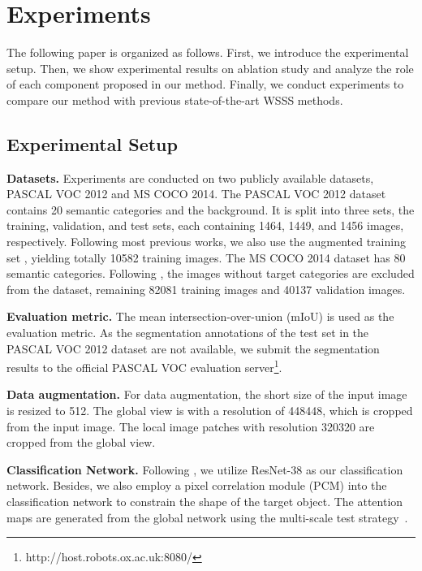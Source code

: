 \documentclass[10pt,twocolumn,letterpaper]{article}
\newcommand{\myParaP}[1]{\vspace{.05in}\noindent\textbf{#1}}
\begin{document}
\section{Experiments} 
The following paper is organized as follows.
First, we introduce the experimental setup.
Then, we show experimental results on ablation study
and analyze the role of each component proposed in our method.
Finally, we conduct experiments to compare our method with 
previous state-of-the-art WSSS methods.





\subsection{Experimental Setup} \label{sec:exp_setup}


\myParaP{Datasets.}
Experiments are conducted on two publicly available datasets, PASCAL VOC 2012
and MS COCO 2014.
The PASCAL VOC 2012 dataset contains 20 semantic categories and the background.
It is split into three sets, the training, validation, and test sets, 
each containing 1464, 1449, and 1456 images, respectively.
Following most previous works, we also use the augmented training set 
\cite{hariharan2011semantic}, yielding totally 10582 training images.
The MS COCO 2014 dataset has 80 semantic categories. 
Following \cite{choe2020attention,lee2021railroad}, the images without 
target categories are excluded from the dataset, remaining 
82081 training images and 40137 validation images. 


\myParaP{Evaluation metric.}
The mean intersection-over-union (mIoU) \cite{long2015fully} 
is used as the evaluation metric.
As the segmentation annotations of the test set in the PASCAL VOC 2012 dataset
are not available, we submit the segmentation results to the official PASCAL VOC 
evaluation server\footnote{http://host.robots.ox.ac.uk:8080/}.



\myParaP{Data augmentation.}
For data augmentation, the short size of the input image 
is resized to 512.
The global view is with a resolution of 448448, which
is cropped from the input image.
The local image patches with resolution 320320 are 
cropped from the global view.




\myParaP{Classification Network.}
Following \cite{ahn2018learning,lee2021railroad}, we utilize 
ResNet-38 \cite{wu2019wider} as our classification network.
Besides, we also employ a pixel correlation module (PCM) \cite{wang2020self} 
into the classification network to constrain the shape of 
the target object.
The attention maps are generated from the global network 
using the multi-scale test strategy~\cite{ahn2018learning}.
\end{document}
